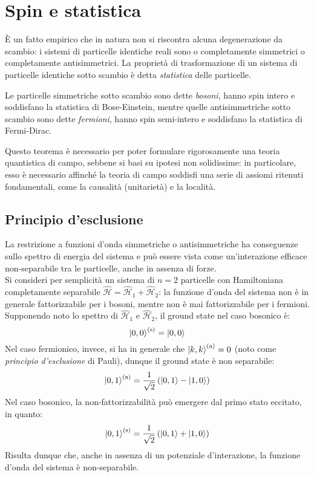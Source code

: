 \section{Spin e statistica}

È un fatto empirico che in natura non si riscontra alcuna degenerazione da scambio: i sistemi di particelle identiche reali sono o completamente simmetrici o completamente antisimmetrici. La proprietà di trasformazione di un sistema di particelle identiche sotto scambio è detta \textit{statistica} delle particelle.

\begin{theorem}
	Le particelle simmetriche sotto scambio sono dette \textit{bosoni}, hanno spin intero e soddisfano la statistica di Bose-Einstein, mentre quelle antisimmetriche sotto scambio sono dette \textit{fermioni}, hanno spin semi-intero e soddisfano la statistica di Fermi-Dirac.
\end{theorem}

Questo teorema è necessario per poter formulare rigorosamente una teoria quantistica di campo, sebbene si basi su ipotesi non solidissime: in particolare, esso è necessario affinché la teoria di campo soddisfi una serie di assiomi ritenuti fondamentali, come la causalità (unitarietà) e la località.

\subsection{Principio d'esclusione}

La restrizione a funzioni d'onda simmetriche o antisimmetriche ha conseguenze sullo spettro di energia del sistema e può essere vista come un'interazione efficace non-separabile tra le particelle, anche in assenza di forze.\\
Si consideri per semplicità un sistema di $ n = 2 $ particelle con Hamiltoniana completamente separabile $ \hat{\mathcal{H}} = \hat{\mathcal{H}}_1 + \hat{\mathcal{H}}_2 $: la funzione d'onda del sistema non è in generale fattorizzabile per i bosoni, mentre non è mai fattorizzabile per i fermioni. Supponendo noto lo spettro di $ \hat{\mathcal{H}}_1 $ e $ \hat{\mathcal{H}}_2 $, il ground state nel caso bosonico è:
\begin{equation*}
	\ket{0,0}^{(\mathrm{s})} = \ket{0,0}
\end{equation*}
Nel caso fermionico, invece, si ha in generale che $ \ket{k,k}^{(\mathrm{a})} = 0 $ (noto come \textit{principio d'esclusione} di Pauli), dunque il ground state è non separabile:
\begin{equation*}
	\ket{0,1}^{(\mathrm{a})} = \frac{1}{\sqrt{2}} \left( \ket{0,1} - \ket{1,0} \right)
\end{equation*}
Nel caso bosonico, la non-fattorizzabilità può emergere dal primo stato eccitato, in quanto:
\begin{equation*}
	\ket{0,1}^{(\mathrm{s})} = \frac{1}{\sqrt{2}} \left( \ket{0,1} + \ket{1,0} \right)
\end{equation*}
Risulta dunque che, anche in assenza di un potenziale d'interazione, la funzione d'onda del sistema è non-separabile.

